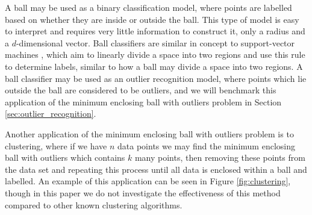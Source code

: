 \documentclass[11pt,twoside]{report}
\theoremstyle{definition}
\numberwithin{theorem}{section}
\numberwithin{definition}{section}
\numberwithin{lemma}{section}
\numberwithin{proposition}{section}
\numberwithin{equation}{section}
\numberwithin{figure}{section}
\begin{document}
A ball may be used as a binary classification model, where points are labelled based on whether they are inside or outside the ball. This type of model is easy to interpret and requires very little information to construct it, only a radius and a $d$-dimensional vector. Ball classifiers are similar in concept to support-vector machines \cite{cortes1995support}, which aim to linearly divide a space into two regions and use this rule to determine labels, similar to how a ball may divide a space into two regions. A ball classifier may be used as an outlier recognition model, where points which lie outside the ball are considered to be outliers, and we will benchmark this application of the minimum enclosing ball with outliers problem in Section \ref{sec:outlier_recognition}.

Another application of the minimum enclosing ball with outliers problem is to clustering, where if we have $n$ data points we may find the minimum enclosing ball with outliers which contains $k$ many points, then removing these points from the data set and repeating this process until all data is enclosed within a ball and labelled. An example of this application can be seen in Figure \ref{fig:clustering}, though in this paper we do not investigate the effectiveness of this method compared to other known clustering algorithms.
\end{document}
